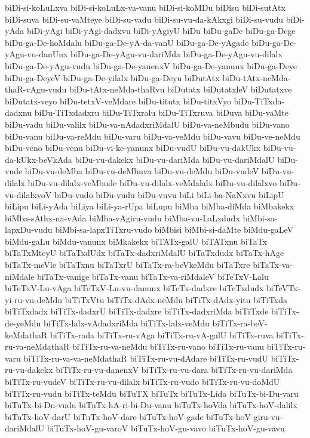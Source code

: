 {biDi-si-koLuLxva
biDi-si-koLuLx-va-vanu
biDi-si-koMDu
biDisu
biDi-sutAtx
biDi-suva
biDi-su-vaMteye
biDi-su-vadu
biDi-su-vu-da-kAkxgi
biDi-su-vudu
biDi-yAda
biDi-yAgi
biDi-yAgi-dadxvu
biDi-yAgiyU
biDu
biDu-gaDe
biDu-ga-Dege
biDu-ga-De-hoMdalu
biDu-ga-De-yA-da-vanU
biDu-ga-De-yAgade
biDu-ga-De-yAgu-vu-danUnx
biDu-ga-De-yAgu-vu-dariMda
biDu-ga-De-yAgu-vu-dilalx
biDu-ga-De-yAgu-vudu
biDu-ga-De-yanenxV
biDu-ga-De-yanunx
biDu-ga-Deye
biDu-ga-DeyeV
biDu-ga-De-yilalx
biDu-ga-Deyu
biDutAtx
biDu-tAtx-neMda-thaR-vAgu-vudu
biDu-tAtx-neMda-thaRvu
biDutatx
biDutatxleV
biDutatxve
biDutatx-veyo
biDu-tetxV-veMdare
biDu-titutx
biDu-titxVyo
biDu-TiTxda-dadxnu
biDu-TiTxdadxru
biDu-TiTxralu
biDu-TiTxruva
biDuva
biDu-vaMte
biDu-vadu
biDu-valilx
biDu-va-nAdadxriMdalU
biDu-va-neMbudu
biDu-vano
biDu-vanu
biDu-va-reMdu
biDu-varu
biDu-va-veMdu
biDu-vavu
biDu-ve-neMdu
biDu-veno
biDu-venu
biDu-vi-ke-yanunx
biDu-vudU
biDu-vu-dakUkx
biDu-vu-da-kUkx-beVkAda
biDu-vu-dakekx
biDu-vu-dariMda
biDu-vu-dariMdalU
biDu-vude
biDu-vu-deMba
biDu-vu-deMbuva
biDu-vu-deMdu
biDu-vudeV
biDu-vu-dilalx
biDu-vu-dilalx-veMbude
biDu-vu-dilalx-veMdalalx
biDu-vu-dilalxvo
biDu-vu-dilalxvoV
biDu-vudo
biDu-vudu
biDu-vuvu
biLi
biLi-ba-NaNxvu
biLipU
biLipu
biLi-yAda
biLiya
biLi-ya-rUpa
biLupu
biMba
biMba-diMda
biMbakekx
biMba-sAthx-na-vAda
biMba-vAgiru-vudu
biMba-vu-LaLxdudx
biMbi-sa-lapxDu-vudu
biMbi-sa-lapxTiTxru-vudo
biMbisi
biMbi-si-daMte
biMdu-gaLeV
biMdu-gaLu
biMdu-vanunx
biMkakekx
biTATx-galU
biTATxnu
biTaTx
biTaTxMteyU
biTaTxdUdx
biTaTx-dadxriMdalU
biTaTxdudx
biTaTx-hAge
biTaTx-meVle
biTaTxnu
biTaTxrU
biTaTx-ra-beVkeMdu
biTaTxre
biTaTx-va-niMdale
biTaTx-vanige
biTaTx-vanu
biTaTx-va-riMdaleV
biTeTxV-Lalu
biTeTxV-Lu-vAga
biTeTxV-Lu-vu-danunx
biTeTx-dadxre
biTeTxdudx
biTeVTx-yi-ru-vu-deMdu
biTiTxVtu
biTiTx-dAdx-neMdu
biTiTx-dAdx-yitu
biTiTxda
biTiTxdadx
biTiTx-dadxrU
biTiTx-dadxre
biTiTx-dadxriMda
biTiTxde
biTiTx-de-yeMdu
biTiTx-lalx-vAdadxriMda
biTiTx-lalx-veMdu
biTiTx-ra-beV-keMdathaR
biTiTx-rada
biTiTx-ru-vAga
biTiTx-ru-vA-galU
biTiTx-ruva
biTiTx-ru-va-neMdathaR
biTiTx-ru-va-neMdu
biTiTx-ru-vano
biTiTx-ru-vanu
biTiTx-ru-varu
biTiTx-ru-va-va-neMdathaR
biTiTx-ru-vu-dAdare
biTiTx-ru-vudU
biTiTx-ru-vu-dakekx
biTiTx-ru-vu-danenxV
biTiTx-ru-vu-dara
biTiTx-ru-vu-dariMda
biTiTx-ru-vudeV
biTiTx-ru-vu-dilalx
biTiTx-ru-vudo
biTiTx-ru-vu-doMdU
biTiTx-ru-vudu
biTiTx-teMdu
biTuTX
biTuTx
biTuTx-Lida
biTuTx-bi-Du-varu
biTuTx-bi-Du-vudu
biTuTx-hA-ri-bi-Du-vanu
biTuTx-hoVda
biTuTx-hoV-dalilx
biTuTx-hoV-darU
biTuTx-hoV-dare
biTuTx-hoV-gade
biTuTx-hoV-giru-vu-dariMdalU
biTuTx-hoV-gu-varoV
biTuTx-hoV-gu-vavo
biTuTx-hoV-gu-vavu
}
